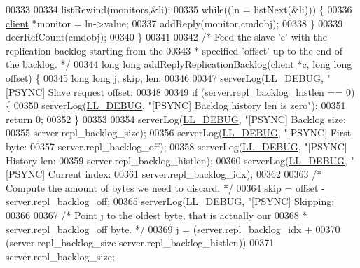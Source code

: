 \begin{DoxyCode}
{{{{{{{{{{00333 
00334     listRewind(monitors,&li);
00335     \textcolor{keywordflow}{while}((ln = listNext(&li))) \{
00336         \hyperlink{structclient}{client} *monitor = ln->value;
00337         addReply(monitor,cmdobj);
00338     \}
00339     decrRefCount(cmdobj);
00340 \}
00341 
00342 \textcolor{comment}{/* Feed the slave 'c' with the replication backlog starting from the}
00343 \textcolor{comment}{ * specified 'offset' up to the end of the backlog. */}
00344 \textcolor{keywordtype}{long} \textcolor{keywordtype}{long} addReplyReplicationBacklog(\hyperlink{structclient}{client} *c, \textcolor{keywordtype}{long} \textcolor{keywordtype}{long} offset) \{
00345     \textcolor{keywordtype}{long} \textcolor{keywordtype}{long} j, skip, len;
00346 
00347     serverLog(\hyperlink{server_8h_abcaffe365dee628fcf9fc90c69d534a1}{LL\_DEBUG}, \textcolor{stringliteral}{"[PSYNC] Slave request offset: %
00348 
00349     \textcolor{keywordflow}{if} (server.repl\_backlog\_histlen == 0) \{
00350         serverLog(\hyperlink{server_8h_abcaffe365dee628fcf9fc90c69d534a1}{LL\_DEBUG}, \textcolor{stringliteral}{"[PSYNC] Backlog history len is zero"});
00351         \textcolor{keywordflow}{return} 0;
00352     \}
00353 
00354     serverLog(\hyperlink{server_8h_abcaffe365dee628fcf9fc90c69d534a1}{LL\_DEBUG}, \textcolor{stringliteral}{"[PSYNC] Backlog size: %
00355              server.repl\_backlog\_size);
00356     serverLog(\hyperlink{server_8h_abcaffe365dee628fcf9fc90c69d534a1}{LL\_DEBUG}, \textcolor{stringliteral}{"[PSYNC] First byte: %
00357              server.repl\_backlog\_off);
00358     serverLog(\hyperlink{server_8h_abcaffe365dee628fcf9fc90c69d534a1}{LL\_DEBUG}, \textcolor{stringliteral}{"[PSYNC] History len: %
00359              server.repl\_backlog\_histlen);
00360     serverLog(\hyperlink{server_8h_abcaffe365dee628fcf9fc90c69d534a1}{LL\_DEBUG}, \textcolor{stringliteral}{"[PSYNC] Current index: %
00361              server.repl\_backlog\_idx);
00362 
00363     \textcolor{comment}{/* Compute the amount of bytes we need to discard. */}
00364     skip = offset - server.repl\_backlog\_off;
00365     serverLog(\hyperlink{server_8h_abcaffe365dee628fcf9fc90c69d534a1}{LL\_DEBUG}, \textcolor{stringliteral}{"[PSYNC] Skipping: %
00366 
00367     \textcolor{comment}{/* Point j to the oldest byte, that is actually our}
00368 \textcolor{comment}{     * server.repl\_backlog\_off byte. */}
00369     j = (server.repl\_backlog\_idx +
00370         (server.repl\_backlog\_size-server.repl\_backlog\_histlen)) %
00371         server.repl\_backlog\_size;
}}}}}}}}}}}}}}}}
\end{DoxyCode}

